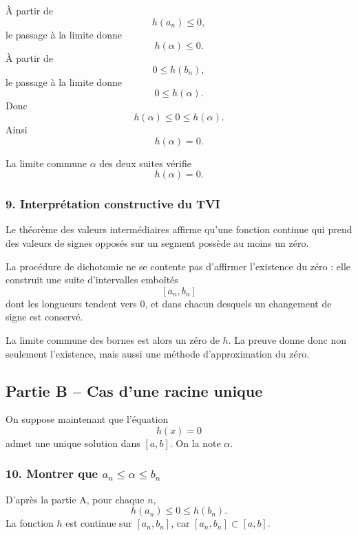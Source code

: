 \documentclass[11pt,a4paper]{article}
\begin{document}
À partir de
\[
h(a_n)\leq0,
\]
le passage à la limite donne
\[
h(\alpha)\leq0.
\]
À partir de
\[
0\leq h(b_n),
\]
le passage à la limite donne
\[
0\leq h(\alpha).
\]
Donc
\[
h(\alpha)\leq0\leq h(\alpha).
\]
Ainsi
\[
h(\alpha)=0.
\]

\begin{resultatbox}
La limite commune \(\alpha\) des deux suites vérifie
\[
h(\alpha)=0.
\]
\end{resultatbox}


\subsubsection*{9. Interprétation constructive du TVI}

Le théorème des valeurs intermédiaires affirme qu'une fonction continue qui prend des valeurs de signes opposés sur un segment possède au moins un zéro.

La procédure de dichotomie ne se contente pas d'affirmer l'existence du zéro : elle construit une suite d'intervalles emboîtés
\[
[a_n,b_n]
\]
dont les longueurs tendent vers \(0\), et dans chacun desquels un changement de signe est conservé.

La limite commune des bornes est alors un zéro de \(h\). La preuve donne donc non seulement l'existence, mais aussi une méthode d'approximation du zéro.


\subsection*{Partie B -- Cas d'une racine unique}

On suppose maintenant que l'équation
\[
h(x)=0
\]
admet une unique solution dans \([a,b]\). On la note \(\alpha\).


\subsubsection*{10. Montrer que \(a_n\leq\alpha\leq b_n\)}

D'après la partie A, pour chaque \(n\),
\[
h(a_n)\leq0\leq h(b_n).
\]
La fonction \(h\) est continue sur \([a_n,b_n]\), car \([a_n,b_n]\subset[a,b]\).
\end{document}
